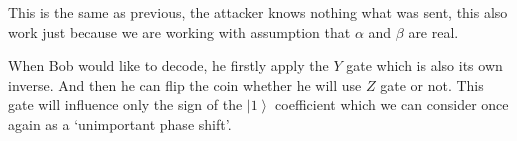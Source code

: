 \documentclass[a4paper,10pt]{article}
\newcommand{\ket}[1]{\ensuremath{\left|#1\right\rangle}} %
\begin{document}
\begin{enumerate}[1.]
This is the same as previous, the attacker knows nothing what was sent, this also work just because we are working with assumption that $\alpha$ and $\beta$ are real.

When Bob would like to decode, he firstly apply the $Y$ gate which is also its own inverse. And then he can flip the coin whether he will use $Z$ gate or not. This gate will influence only the sign of the \ket{1} coefficient which we can consider once again as a `unimportant phase shift'.
\end{enumerate}
\end{document}
